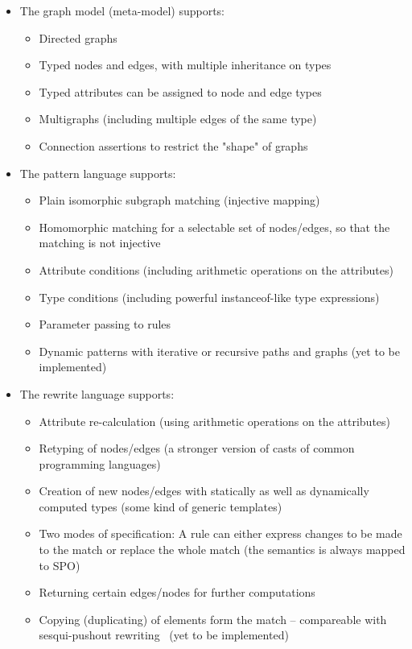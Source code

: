 \begin{itemize}
  \item The graph model (meta-model) supports:
  \begin{itemize}
    \item Directed graphs
    \item Typed nodes and edges, with multiple inheritance on types
    \item Typed attributes can be assigned to node and edge types
    \item Multigraphs (including multiple edges of the same type)
    \item Connection assertions to restrict the "shape" of graphs
  \end{itemize}
  
  \item The pattern language supports:
  \begin{itemize}
    \item Plain isomorphic subgraph matching (injective mapping)
    \item Homomorphic matching for a selectable set of nodes/edges, so that the matching is not injective
    \item Attribute conditions (including arithmetic operations on the attributes)
    \item Type conditions (including powerful instanceof-like type expressions)
    \item Parameter passing to rules
    \item Dynamic patterns with iterative or recursive paths and graphs (yet to be implemented)
  \end{itemize}
  
  \item The rewrite language supports:
  \begin{itemize}
    \item Attribute re-calculation (using arithmetic operations on the attributes)
    \item Retyping of nodes/edges (a stronger version of casts of common programming languages)
    \item Creation of new nodes/edges with statically as well as dynamically computed types (some kind of generic templates)
    \item Two modes of specification: A rule can either express changes to be made to the match or replace the whole match (the semantics is always mapped to SPO)
    \item Returning certain edges/nodes for further computations
	  \item Copying (duplicating) of elements form the match -- compareable with sesqui-pushout rewriting~\cite{} (yet to be implemented)
  \end{itemize}
  

\end{itemize}
